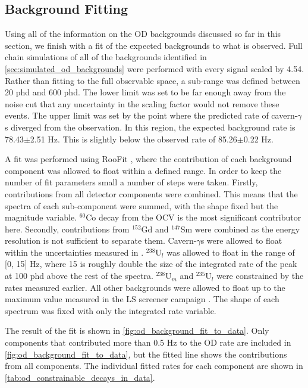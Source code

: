 \subsection{Background Fitting}
\par
Using all of the information on the OD backgrounds discussed so far in this section, we finish with a fit of the expected backgrounds to what is observed.
Full chain simulations of all of the backgrounds identified in \autoref{sec:simulated_od_backgrounds} were performed with every signal scaled by 4.54.
Rather than fitting to the full observable space, a sub-range was defined between 20 phd and 600 phd.
The lower limit was set to be far enough away from the noise cut that any uncertainty in the scaling factor would not remove these events.
The upper limit was set by the point where the predicted rate of cavern-$\gamma$s diverged from the observation.
In this region, the expected background rate is 78.43$\pm$2.51 Hz.
This is slightly below the observed rate of 85.26$\pm$0.22 Hz.
\par
A fit was performed using RooFit \cite{roostats_ref}, where the contribution of each background component was allowed to float within a defined range.
In order to keep the number of fit parameters small a number of steps were taken.
Firstly, contributions from all detector components were combined.
This means that the spectra of each sub-component were summed, with the shape fixed but the magnitude variable.
${}^{60}$Co decay from the OCV is the most significant contributor here.
Secondly, contributions from ${}^{152}$Gd and ${}^{147}$Sm were combined as the energy resolution is not sufficient to separate them.
Cavern-$\gamma$s were allowed to float within the uncertainties measured in \cite{LZ_Gamma_Ray_Background_ref}.
${}^{238}$U$_l$ was allowed to float in the range of [0, 15] Hz, where 15 is roughly double the size of the integrated rate of the peak at 100 phd above the rest of the spectra.
${}^{238}$U$_{m}$ and ${}^{235}$U$_{l}$ were constrained by the rates measured earlier.
All other backgrounds were allowed to float up to the maximum value measured in the LS screener campaign \cite{scotthaselschwardt_thesis_ref}.
The shape of each spectrum was fixed with only the integrated rate variable.
\par
The result of the fit is shown in \autoref{fig:od_background_fit_to_data}.
Only components that contributed more than 0.5 Hz to the OD rate are included in \autoref{fig:od_background_fit_to_data}, but the fitted line shows the contributions from all components.
The individual fitted rates for each component are shown in \autoref{tab:od_constrainable_decays_in_data}.
